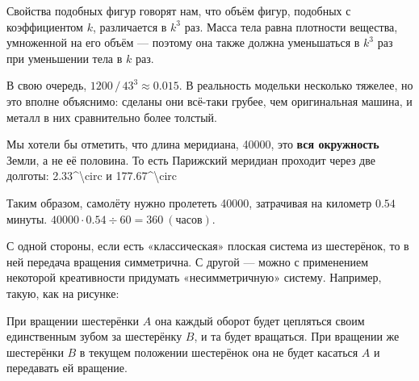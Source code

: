 \begin{itemize}
\itA Свойства подобных фигур говорят нам, что объём фигур, подобных с коэффициентом $k$, различается в $k^3$ раз. Масса тела равна плотности вещества, умноженной на его объём — поэтому она также должна уменьшаться в $k^3$ раз при уменьшении тела в $k$ раз.

В свою очередь, $1200\,/\,43^3 \approx 0.015$. В реальность модельки несколько тяжелее, но это вполне объяснимо: сделаны они всё-таки грубее, чем оригинальная машина, и металл в них сравнительно более толстый.

\itB Мы хотели бы отметить, что длина меридиана, \SI{40000}{}, это {\bfseries вся окружность} Земли, а не её половина. То есть Парижский меридиан проходит через две долготы: \SI{2.33^\circ}{} и \SI{177.67^\circ}{}

Таким образом, самолёту нужно пролететь \SI{40000}{}, затрачивая на километр $0.54$ минуты. $40000 \cdot 0.54 \div 60 = \SI{360}{(\text{часов})}$.

\itC С одной стороны, если есть «классическая» плоская система из шестерёнок, то в ней передача вращения симметрична. С другой — можно с применением некоторой креативности придумать «несимметричную» систему. Например, такую, как на рисунке:

\begin{center}

\end{center}

При вращении шестерёнки $A$ она каждый оборот будет цепляться своим единственным зубом за шестерёнку $B$, и та будет вращаться. При вращении же шестерёнки $B$ в текущем положении шестерёнок она не будет касаться $A$ и передавать ей вращение.

\end{itemize}
